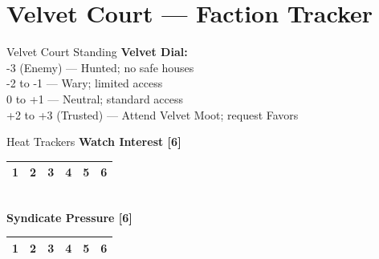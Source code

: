 \documentclass[10pt]{article}
\begin{document}
\newpage

\section*{Velvet Court --- Faction Tracker}

\begin{minipage}[t]{0.48\linewidth}
    \begin{charbox}{Velvet Court Standing}
        \textbf{Velvet Dial:} \underline{\hspace{5cm}}\\
        -3 (Enemy) --- Hunted; no safe houses\\
        -2 to -1 --- Wary; limited access\\
        0 to +1 --- Neutral; standard access\\
        +2 to +3 (Trusted) --- Attend Velvet Moot; request Favors
    \end{charbox}
    
    \vspace{0.5em}
    
    \begin{charbox}{Heat Trackers}
        \textbf{Watch Interest [6]}\\
        \begin{tabular}{|p{1cm}|p{1cm}|p{1cm}|p{1cm}|p{1cm}|p{1cm}|}
            \hline
            1 & 2 & 3 & 4 & 5 & 6 \\
            \hline
        \end{tabular}\\
        \textbf{Syndicate Pressure [6]}\\
        \begin{tabular}{|p{1cm}|p{1cm}|p{1cm}|p{1cm}|p{1cm}|p{1cm}|}
            \hline
            1 & 2 & 3 & 4 & 5 & 6 \\
            \hline
        \end{tabular}
    \end{charbox}
    
    \vspace{0.5em}
    

\end{minipage}
\end{document}
